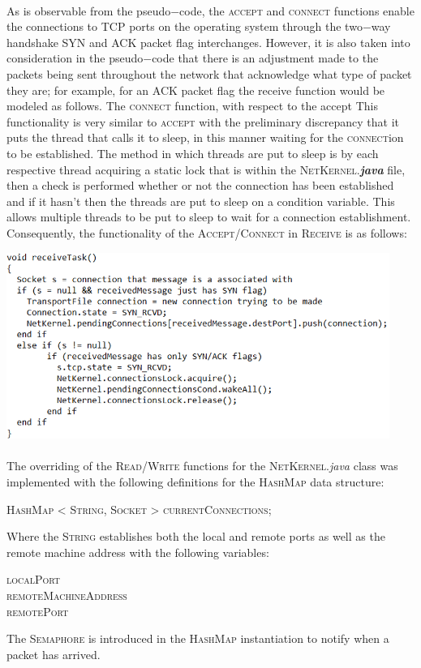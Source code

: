 \documentclass[12pt]{article}
\begin{document}
{    \paragraph{} As is observable from the pseudo$-$code, the \textsc{accept} and \textsc{connect} functions enable the connections to TCP ports on the operating system
    through the two$-$way handshake \textsc{SYN} and \textsc{ACK} packet flag interchanges. However, it is also taken into consideration in the pseudo$-$code that there is an adjustment made to the packets being sent throughout the network that acknowledge what type of packet they are; for example, for an \textsc{ACK} packet flag the receive function would be modeled as follows. 
    The \textsc{connect} function, with respect to the accept 
    This functionality is very similar to \textsc{accept} with the preliminary discrepancy that it puts the thread that calls it to sleep, in this manner waiting for the \textsc{connect}ion to be established.
    The method in which threads are put to sleep is by each respective thread acquiring a static lock that is within the \textsc{NetKernel}.\textbf{\textit{java}} file, then a check is performed whether or not the connection has been established and if it hasn't then the threads are put to sleep on a condition variable. This allows multiple threads to be put to sleep to wait for a connection establishment. 
    Consequently, the functionality of the \textsc{Accept}/\textsc{Connect} in \textsc{Receive} is as follows:
    \begin{center} \includegraphics[width=125mm]{accpetConnectinReceive.png} \end{center}
    \paragraph{} The overriding of the \textsc{Read}/\textsc{Write} functions for the \textsc{NetKernel}.\textit{java} class was implemented with the following definitions for the \textsc{HashMap} data structure:
    \begin{center} \textsc{HashMap < String, Socket > currentConnections}; \end{center} 
    Where the \textsc{String} establishes both the local and remote ports as well as the remote machine address with the following variables:
    \begin{center} \textsc{localPort} \\ \textsc{remoteMachineAddress} \\ \textsc{remotePort} \end{center} 
    The \textsc{Semaphore} is introduced in the \textsc{HashMap} instantiation to notify when a packet has arrived.
}
\end{document}
